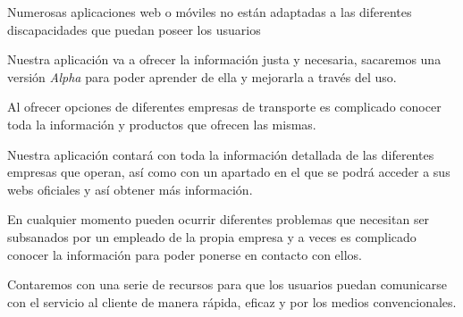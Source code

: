 \vspace{0.5cm}

\begin{problema}

      Numerosas aplicaciones web o móviles no están adaptadas a las diferentes
      discapacidades que puedan poseer los usuarios

            {\centering
                  \begin{vision}\justifying\noindent
                        Nuestra aplicación va a ofrecer la información justa y necesaria, sacaremos una versión \textit{Alpha} para poder aprender de ella y mejorarla a través del uso.
                  \end{vision}}
\end{problema}

\vspace{0.5cm}

\begin{problema}

      Al ofrecer opciones de diferentes empresas de transporte es complicado conocer
      toda la información y productos que ofrecen las mismas.

            {\centering
                  \begin{vision}\justifying\noindent
                        Nuestra aplicación contará con toda la información detallada de las diferentes empresas que operan, así como con un apartado en el que se podrá acceder a sus webs oficiales y así obtener más información.
                  \end{vision}}
\end{problema}

\vspace{0.5cm}

\begin{problema}

      En cualquier momento pueden ocurrir diferentes problemas que necesitan ser
      subsanados por un empleado de la propia empresa y a veces es complicado conocer
      la información para poder ponerse en contacto con ellos.

            {\centering
                  \begin{vision}\justifying\noindent
                        Contaremos con una serie de recursos para que los usuarios puedan comunicarse con el servicio al cliente de manera rápida, eficaz y por los medios convencionales.
                  \end{vision}}
\end{problema}

